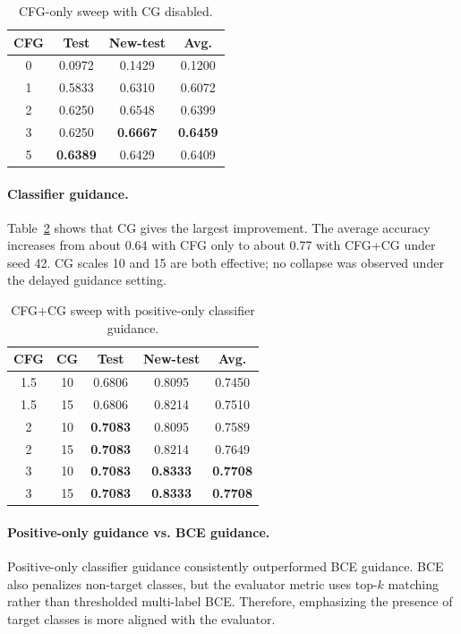 \documentclass[10pt,twocolumn,letterpaper]{article}
\begin{document}
\begin{table}[h]
\centering
\begin{tabular}{cccc}
\toprule
CFG & Test & New-test & Avg. \\
\midrule
0 & 0.0972 & 0.1429 & 0.1200 \\
1 & 0.5833 & 0.6310 & 0.6072 \\
2 & 0.6250 & 0.6548 & 0.6399 \\
3 & 0.6250 & \cellcolor{yellow!25}\textbf{0.6667} & \cellcolor{yellow!25}\textbf{0.6459} \\
5 & \cellcolor{yellow!25}\textbf{0.6389} & 0.6429 & 0.6409 \\
\bottomrule
\end{tabular}
\caption{CFG-only sweep with CG disabled.}
\label{tab:cfg_only}
\end{table}

\paragraph{Classifier guidance.}
Table~\ref{tab:cfg_cg} shows that CG gives the largest improvement. The average accuracy increases from about 0.64 with CFG only to about 0.77 with CFG+CG under seed 42. CG scales 10 and 15 are both effective; no collapse was observed under the delayed guidance setting.

\begin{table}[h]
\centering
\begin{tabular}{ccccc}
\toprule
CFG & CG & Test & New-test & Avg. \\
\midrule
1.5 & 10 & 0.6806 & 0.8095 & 0.7450 \\
1.5 & 15 & 0.6806 & 0.8214 & 0.7510 \\
2 & 10 & \cellcolor{yellow!25}\textbf{0.7083} & 0.8095 & 0.7589 \\
2 & 15 & \cellcolor{yellow!25}\textbf{0.7083} & 0.8214 & 0.7649 \\
3 & 10 & \cellcolor{yellow!25}\textbf{0.7083} & \cellcolor{yellow!25}\textbf{0.8333} & \cellcolor{yellow!25}\textbf{0.7708} \\
3 & 15 & \cellcolor{yellow!25}\textbf{0.7083} & \cellcolor{yellow!25}\textbf{0.8333} & \cellcolor{yellow!25}\textbf{0.7708} \\
\bottomrule
\end{tabular}
\caption{CFG+CG sweep with positive-only classifier guidance.}
\label{tab:cfg_cg}
\end{table}

\paragraph{Positive-only guidance vs. BCE guidance.}
Positive-only classifier guidance consistently outperformed BCE guidance. BCE also penalizes non-target classes, but the evaluator metric uses top-$k$ matching rather than thresholded multi-label BCE. Therefore, emphasizing the presence of target classes is more aligned with the evaluator.
\end{document}
